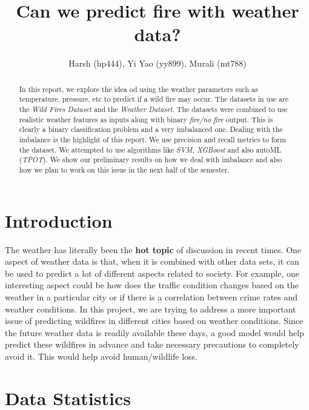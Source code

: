 \documentclass{article}
\begin{document}
\title{\bf Can we predict fire with weather data?}
\author{Harsh (hp444), Yi Yao (yy899), Murali (mt788)}
\maketitle

\begin{abstract}
In this report, we explore the idea od using the weather parameters such as
temperature, pressure, etc to predict if a wild fire may occur. The datasets in
use are the \textit{Wild Fires Dataset} and the \textit{Weather Dataset}.
The datasets were combined to use realistic weather features as inputs along
with binary \textit{fire/no fire} output. This is clearly a binary
classification problem and a very imbalanced one. Dealing with the imbalance is
the highlight of this report. We use precision and recall metrics to form the
dataset. We attempted to use algorithms like \textit{SVM, XGBoost} and also
autoML (\textit{TPOT}). We show our preliminary results on how we deal with
imbalance and also how we plan to work on this issue in the next half of the
semester.\par
\end{abstract}

\section{Introduction}

The weather has literally been the \textbf{hot topic} of discussion in recent
times. One aspect of weather data is that, when it is combined with other data
sets, it can be used to predict a lot of different aspects related to society.
For example, one interesting aspect could be how does the traffic condition
changes based on the weather in a particular city or if there is a correlation
between crime rates and weather conditions. In this project, we are trying to
address a more important issue of predicting wildfires in different cities
based on weather conditions. Since the future weather data is readily available
these days, a good model would help predict these wildfires in advance and take
necessary precautions to completely avoid it. This would help avoid
human/wildlife loss.\par

\section{Data Statistics}
\end{document}
